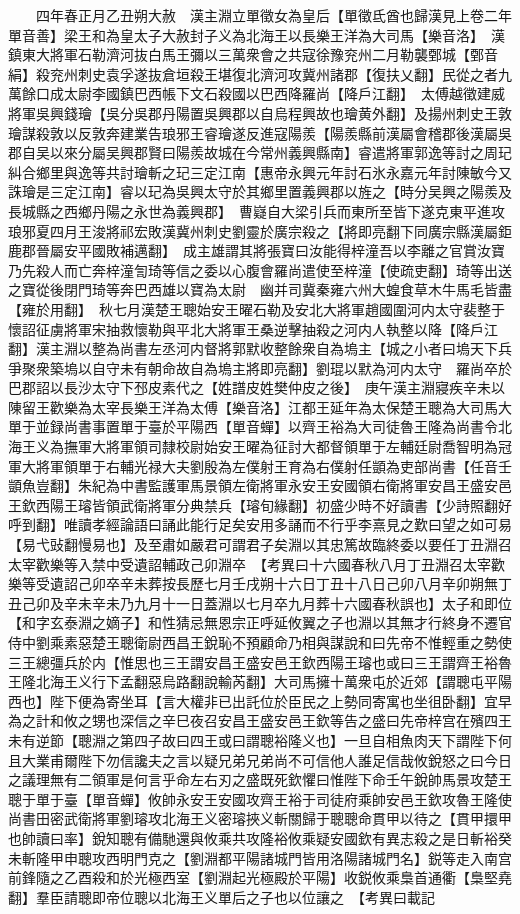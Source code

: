　　四年春正月乙丑朔大赦　漢主淵立單徵女為皇后【單徵氐酋也歸漢見上卷二年單音善】梁王和為皇太子大赦封子义為北海王以長樂王洋為大司馬【樂音洛】　漢鎮東大將軍石勒濟河抜白馬王彌以三萬衆會之共寇徐豫兖州二月勒襲鄄城【鄄音絹】殺兖州刺史袁孚遂抜倉垣殺王堪復北濟河攻冀州諸郡【復扶乂翻】民從之者九萬餘口成太尉李國鎮巴西帳下文石殺國以巴西降羅尚【降戶江翻】　太傅越徵建威將軍吳興錢璯【吳分吳郡丹陽置吳興郡以自烏程興故也璯黄外翻】及揚州刺史王敦璯謀殺敦以反敦奔建業告琅邪王睿璯遂反進寇陽羨【陽羨縣前漢屬會稽郡後漢屬吳郡自吴以來分屬吴興郡賢曰陽羨故城在今常州義興縣南】睿遣將軍郭逸等討之周玘糾合鄉里與逸等共討璯斬之玘三定江南【惠帝永興元年討石氷永嘉元年討陳敏今又誅璯是三定江南】睿以玘為吳興太守於其鄉里置義興郡以旌之【時分吴興之陽羨及長城縣之西鄉丹陽之永世為義興郡】　曹嶷自大梁引兵而東所至皆下遂克東平進攻琅邪夏四月王浚將祁宏敗漢冀州刺史劉靈於廣宗殺之【將即亮翻下同廣宗縣漢屬鉅鹿郡晉屬安平國敗補邁翻】　成主雄謂其將張寶曰汝能得梓潼吾以李離之官賞汝寶乃先殺人而亡奔梓潼訇琦等信之委以心腹會羅尚遣使至梓潼【使疏吏翻】琦等出送之寶從後閉門琦等奔巴西雄以寶為太尉　幽并司冀秦雍六州大蝗食草木牛馬毛皆盡【雍於用翻】　秋七月漢楚王聰始安王曜石勒及安北大將軍趙國圍河内太守裴整于懷詔征虜將軍宋抽救懷勒與平北大將軍王桑逆擊抽殺之河内人執整以降【降戶江翻】漢主淵以整為尚書左丞河内督將郭默收整餘衆自為塢主【城之小者曰塢天下兵爭聚衆築塢以自守未有朝命故自為塢主將即亮翻】劉琨以默為河内太守　羅尚卒於巴郡詔以長沙太守下邳皮素代之【姓譜皮姓樊仲皮之後】　庚午漢主淵寢疾辛未以陳留王歡樂為太宰長樂王洋為太傅【樂音洛】江都王延年為太保楚王聰為大司馬大單于並録尚書事置單于臺於平陽西【單音蟬】以齊王裕為大司徒魯王隆為尚書令北海王义為撫軍大將軍領司隸校尉始安王曜為征討大都督領單于左輔廷尉喬智明為冠軍大將軍領單于右輔光禄大夫劉殷為左僕射王育為右僕射任顗為吏部尚書【任音壬顗魚豈翻】朱紀為中書監護軍馬景領左衛將軍永安王安國領右衛將軍安昌王盛安邑王欽西陽王璿皆領武衛將軍分典禁兵【璿旬緣翻】初盛少時不好讀書【少詩照翻好呼到翻】唯讀孝經論語曰誦此能行足矣安用多誦而不行乎李熹見之歎曰望之如可易【易弋䜴翻慢易也】及至肅如嚴君可謂君子矣淵以其忠篤故臨終委以要任丁丑淵召太宰歡樂等入禁中受遺詔輔政己卯淵卒　【考異曰十六國春秋八月丁丑淵召太宰歡樂等受遺詔己卯卒辛未葬按長歷七月壬戌朔十六日丁丑十八日己卯八月辛卯朔無丁丑己卯及辛未辛未乃九月十一日蓋淵以七月卒九月葬十六國春秋誤也】太子和即位【和字玄泰淵之嫡子】和性猜忌無恩宗正呼延攸翼之子也淵以其無才行終身不遷官侍中劉乘素惡楚王聰衛尉西昌王銳恥不預顧命乃相與謀說和曰先帝不惟輕重之勢使三王總彊兵於内【惟思也三王謂安昌王盛安邑王欽西陽王璿也或曰三王謂齊王裕魯王隆北海王义行下孟翻惡烏路翻說輸芮翻】大司馬擁十萬衆屯於近郊【謂聰屯平陽西也】陛下便為寄坐耳【言大權非已出託位於臣民之上勢同寄寓也坐徂卧翻】宜早為之計和攸之甥也深信之辛巳夜召安昌王盛安邑王欽等告之盛曰先帝梓宫在殯四王未有逆節【聰淵之第四子故曰四王或曰謂聰裕隆义也】一旦自相魚肉天下謂陛下何且大業甫爾陛下勿信讒夫之言以疑兄弟兄弟尚不可信他人誰足信哉攸銳怒之曰今日之議理無有二領軍是何言乎命左右刃之盛既死欽懼曰惟陛下命壬午銳帥馬景攻楚王聰于單于臺【單音蟬】攸帥永安王安國攻齊王裕于司徒府乘帥安邑王欽攻魯王隆使尚書田密武衛將軍劉璿攻北海王义密璿挾义斬關歸于聰聰命貫甲以待之【貫甲擐甲也帥讀曰率】銳知聰有備馳還與攸乘共攻隆裕攸乘疑安國欽有異志殺之是日斬裕癸未斬隆甲申聰攻西明門克之【劉淵都平陽諸城門皆用洛陽諸城門名】鋭等走入南宫前鋒隨之乙酉殺和於光極西室【劉淵起光極殿於平陽】收鋭攸乘梟首通衢【梟堅堯翻】羣臣請聰即帝位聰以北海王义單后之子也以位讓之　【考異曰載記